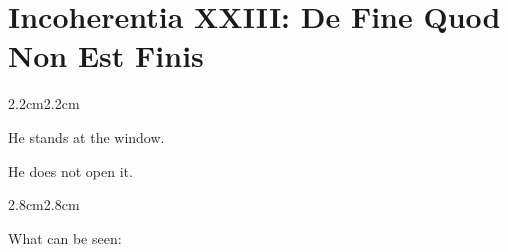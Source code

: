 
\chapter*{Incoherentia XXIII: De Fine Quod Non Est Finis}

\pagestyle{plain}

\vspace{2em}

\begin{adjustwidth}{2.2cm}{2.2cm}

He stands at the window.

\vspace{1em}

He does not open it.

\vspace{2em}

\end{adjustwidth}

\begin{adjustwidth}{2.8cm}{2.8cm}

\noindent What can be seen:

\vspace{1.5em}

\end{adjustwidth}

